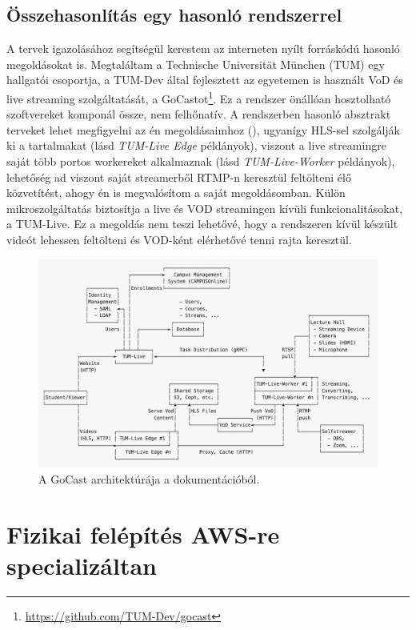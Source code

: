 \subsection{Összehasonlítás egy hasonló rendszerrel}

A tervek igazolásához segítségül kerestem az interneten nyílt forráskódú hasonló megoldásokat is. Megtaláltam a Technische Universität München (TUM) egy hallgatói csoportja, a TUM-Dev által fejlesztett az egyetemen is használt VoD és live streaming szolgáltatását, a GoCastot\footnote{\url{https://github.com/TUM-Dev/gocast}}. Ez a rendszer önállóan hosztolható szoftvereket komponál össze, nem felhőnatív. A rendszerben hasonló absztrakt terveket lehet megfigyelni az én megoldásaimhoz (), ugyanígy HLS-sel szolgálják ki a tartalmakat (lásd \emph{TUM-Live Edge} példányok), viszont a live streamingre saját több portos workereket alkalmaznak (lásd \emph{TUM-Live-Worker} példányok), lehetőség ad viszont saját streamerből RTMP-n keresztül feltölteni élő közvetítést, ahogy én is megvalósítom a saját megoldásomban. Külön mikroszolgáltatás biztosítja a live és VOD streamingen kívüli funkcionalitásokat, a TUM-Live. Ez a megoldás nem teszi lehetővé, hogy a rendszeren kívül készült videót lehessen feltölteni és VOD-ként elérhetővé tenni rajta keresztül.

\begin{figure}[ht]
	\centering
	\includegraphics[width=140mm, keepaspectratio]{figures/gocast.png}
	\caption{A GoCast architektúrája a dokumentációból.}
	\label{fig:gocast}
\end{figure}

\section{Fizikai felépítés AWS-re specializáltan}

